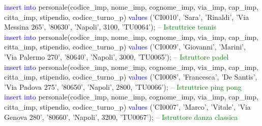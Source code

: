 \documentclass{article}
\begin{document}
\begin{flushleft}
{        \vspace{2mm}
        \hspace*{0.5em}\textcolor{blue}{insert into} personale(codice\_imp, nome\_imp, cognome\_imp, via\_imp, cap\_imp, \hspace*{0.5em}citta\_imp, stipendio, codice\_turno\_p) \textcolor{blue}{values} ('CI0010', 'Sara', 'Rinaldi', 'Via \hspace*{0.5em}Messina 265', \hspace*{0.5em}'80630', 'Napoli', 3100, 'TU0064'); \hspace*{0.5em} \textcolor{green}{-- Istruttrice tennis} \\
        \vspace{2mm}
        \hspace*{0.5em}\textcolor{blue}{insert into} personale(codice\_imp, nome\_imp, cognome\_imp, via\_imp, cap\_imp, \hspace*{0.5em}citta\_imp, stipendio, codice\_turno\_p) \textcolor{blue}{values} ('CI0009', 'Giovanni', 'Marini', \hspace*{0.5em}'Via Palermo 270', \hspace*{0.5em}'80640', 'Napoli', 3000, 'TU0065'); \hspace*{0.5em} \textcolor{green}{-- Istruttore padel} \\
        \vspace{2mm}
        \hspace*{0.5em}\textcolor{blue}{insert into} personale(codice\_imp, nome\_imp, cognome\_imp, via\_imp, cap\_imp, \hspace*{0.5em}citta\_imp, stipendio, codice\_turno\_p) \textcolor{blue}{values} ('CI0008', 'Francesca', 'De Santis', \hspace*{0.5em}'Via Padova \hspace*{0.5em}275', '80650', 'Napoli', 2800, 'TU0066'); \hspace*{0.5em} \textcolor{green}{-- Istruttrice ping \hspace*{0.5em}pong} \\
        \vspace{2mm}
        \hspace*{0.5em}\textcolor{blue}{insert into} personale(codice\_imp, nome\_imp, cognome\_imp, via\_imp, cap\_imp, \hspace*{0.5em}citta\_imp, stipendio, codice\_turno\_p) \textcolor{blue}{values} ('CI0007', 'Marco', 'Vitale', 'Via \hspace*{0.5em}Genova 280', \hspace*{0.5em}'80660', 'Napoli', 3200, 'TU0067'); \hspace*{0.5em} \textcolor{green}{-- Istruttore danza classica} \\
}
\end{flushleft}
\end{document}
